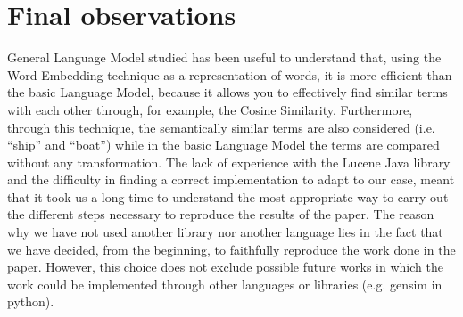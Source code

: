  
\section{Final observations}\label{sec:observations}
 General Language Model studied has been useful to understand that, using the Word Embedding technique as a representation of words, it is more efficient than the basic Language Model, because it allows you to effectively find similar terms with each other through, for example, the Cosine Similarity. Furthermore, through this technique, the semantically similar terms are also considered (i.e. ``ship'' and ``boat'') while in the basic Language Model the terms are compared without any transformation.
The lack of experience with the Lucene Java library and the difficulty in finding a correct implementation to adapt to our case, meant that it took us a long time to understand the most appropriate way to carry out the different steps necessary to reproduce the results of the paper.
The reason why we have not used another library nor another language lies in the fact that we have decided, from the beginning, to faithfully reproduce the work done in the paper. However, this choice does not exclude possible future works in which the work could be implemented through other languages ​​or libraries (e.g. gensim in python).

